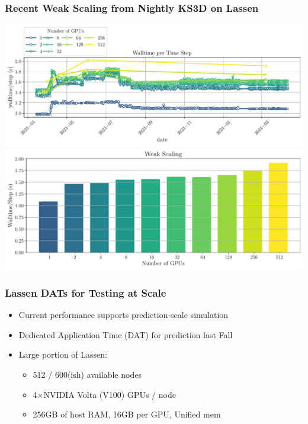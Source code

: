 \begin{frame}\frametitle{Recent Weak Scaling from Nightly KS3D on Lassen}
\begin{center}
  \includegraphics[width=.6\textwidth]{Figures/mtc/NightlyWeak.pdf}
  \includegraphics[width=.6\textwidth]{Figures/mtc/weak_scaling_NightlyWeak.pdf}
\end{center}
\end{frame}

\begin{frame}\frametitle{Lassen DATs for Testing at Scale}
  \begin{itemize}
  \item Current performance supports prediction-scale simulation
  \item Dedicated Application Time (DAT) for prediction last Fall 
  \item Large portion of Lassen:
    \begin{itemize}
    \item 512 / 600(ish) available nodes
    \item 4$\times$NVIDIA Volta (V100) GPUs / node
    \item 256GB of host RAM, 16GB per GPU, Unified mem
    \end{itemize}
  \end{itemize}
\end{frame}

